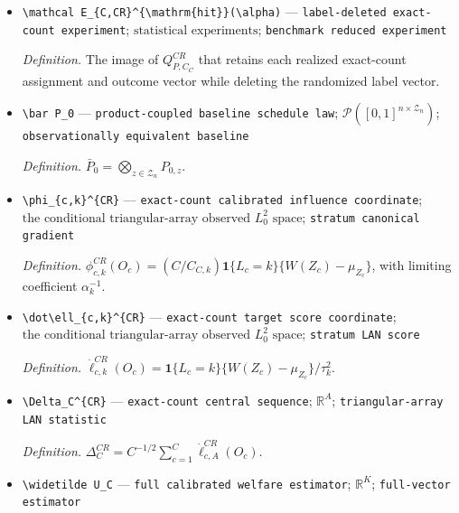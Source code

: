 \documentclass{article}
\begin{document}
\begin{itemize}
  \item \texttt{\textbackslash{}\allowbreak{}mathcal E\_\allowbreak{}\{C,\allowbreak{}CR\}\allowbreak{}\textasciicircum{}\{\textbackslash{}\allowbreak{}mathrm\{hit\}\allowbreak{}\}\allowbreak{}(\textbackslash{}\allowbreak{}alpha)} --- \texttt{label-\allowbreak{}deleted exact-\allowbreak{}count experiment}; \(\text{statistical experiments}\); \texttt{benchmark reduced experiment}
  \par\smallskip\noindent\emph{Definition.} The image of \(Q^{CR}_{P,C_C}\) that retains each realized exact-count assignment and outcome vector while deleting the randomized label vector.
  \item \texttt{\textbackslash{}\allowbreak{}bar P\_\allowbreak{}0} --- \texttt{product-\allowbreak{}coupled baseline schedule law}; \(\mathcal P([0,1]^{n\times\mathcal Z_n})\); \texttt{observationally equivalent baseline}
  \par\smallskip\noindent\emph{Definition.} \(\bar P_0=\bigotimes_{z\in\mathcal Z_n}P_{0,z}\).
  \item \texttt{\textbackslash{}\allowbreak{}phi\_\allowbreak{}\{c,\allowbreak{}k\}\allowbreak{}\textasciicircum{}\{CR\}\allowbreak{}} --- \texttt{exact-\allowbreak{}count calibrated influence coordinate}; \(\text{the conditional triangular-array observed }L^2_0\text{ space}\); \texttt{stratum canonical gradient}
  \par\smallskip\noindent\emph{Definition.} \(\phi_{c,k}^{CR}(O_c)=(C/C_{C,k})\mathbf 1\{L_c=k\}\{W(Z_c)-\mu_{Z_c}\}\), with limiting coefficient \(\alpha_k^{-1}\).
  \item \texttt{\textbackslash{}\allowbreak{}dot\textbackslash{}\allowbreak{}ell\_\allowbreak{}\{c,\allowbreak{}k\}\allowbreak{}\textasciicircum{}\{CR\}\allowbreak{}} --- \texttt{exact-\allowbreak{}count target score coordinate}; \(\text{the conditional triangular-array observed }L^2_0\text{ space}\); \texttt{stratum LAN score}
  \par\smallskip\noindent\emph{Definition.} \(\dot\ell_{c,k}^{CR}(O_c)=\mathbf 1\{L_c=k\}\{W(Z_c)-\mu_{Z_c}\}/\tau_k^2\).
  \item \texttt{\textbackslash{}\allowbreak{}Delta\_\allowbreak{}C\textasciicircum{}\{CR\}\allowbreak{}} --- \texttt{exact-\allowbreak{}count central sequence}; \(\mathbb R^A\); \texttt{triangular-\allowbreak{}array LAN statistic}
  \par\smallskip\noindent\emph{Definition.} \(\Delta_C^{CR}=C^{-1/2}\sum_{c=1}^C\dot\ell_{c,A}^{CR}(O_c)\).
  \item \texttt{\textbackslash{}\allowbreak{}widetilde U\_\allowbreak{}C} --- \texttt{full calibrated welfare estimator}; \(\mathbb R^K\); \texttt{full-\allowbreak{}vector estimator}

\end{itemize}
\end{document}
